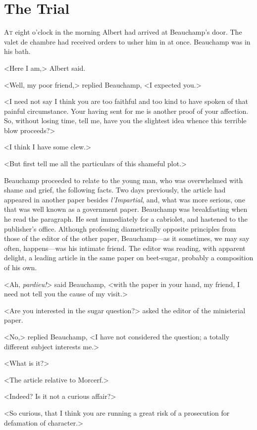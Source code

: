 \chapter{The Trial} 

 \lettrine{A}{t} eight o'clock in the morning Albert had arrived at Beauchamp's door. The valet de chambre had received orders to usher him in at once. Beauchamp was in his bath. 

\zz
 <Here I am,> Albert said. 

 <Well, my poor friend,> replied Beauchamp, <I expected you.> 

 <I need not say I think you are too faithful and too kind to have spoken of that painful circumstance. Your having sent for me is another proof of your affection. So, without losing time, tell me, have you the slightest idea whence this terrible blow proceeds?> 

 <I think I have some clew.> 

 <But first tell me all the particulars of this shameful plot.> 

 Beauchamp proceeded to relate to the young man, who was overwhelmed with shame and grief, the following facts. Two days previously, the article had appeared in another paper besides \textit{l'Impartial}, and, what was more serious, one that was well known as a government paper. Beauchamp was breakfasting when he read the paragraph. He sent immediately for a cabriolet, and hastened to the publisher's office. Although professing diametrically opposite principles from those of the editor of the other paper, Beauchamp—as it sometimes, we may say often, happens—was his intimate friend. The editor was reading, with apparent delight, a leading article in the same paper on beet-sugar, probably a composition of his own. 

 <Ah, \textit{pardieu!}> said Beauchamp, <with the paper in your hand, my friend, I need not tell you the cause of my visit.> 

 <Are you interested in the sugar question?> asked the editor of the ministerial paper. 

 <No,> replied Beauchamp, <I have not considered the question; a totally different subject interests me.> 

 <What is it?> 

 <The article relative to Morcerf.> 

 <Indeed? Is it not a curious affair?> 

 <So curious, that I think you are running a great risk of a prosecution for defamation of character.> 


